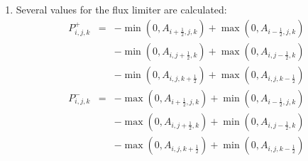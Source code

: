 {\begin{enumerate}
\begin{eqnarray}
&&\max( \left(\rho q\right)^{\dagger}_{i,j-1,k},\left(\rho q\right)^{n}_{i,j-1,k} ),\nonumber\\
&&\max( \left(\rho q\right)^{\dagger}_{i,j+1,k},\left(\rho q\right)^{n}_{i,j+1,k} ),\nonumber\\
&&\max( \left(\rho q\right)^{\dagger}_{i,j,k-1},\left(\rho q\right)^{n}_{i,j,k-1} ),\nonumber\\
&&\max( \left(\rho q\right)^{\dagger}_{i,j,k+1},\left(\rho q\right)^{n}_{i,j,k+1} ) \nonumber\\
&&]\\
\left(\rho q\right)^{\min}_{i,j,k}
&=& \min [\nonumber\\
&&\min( \left(\rho q\right)^{\dagger}_{i,j,k},\left(\rho q\right)^{n}_{i,j,k} ),\nonumber\\
&&\min( \left(\rho q\right)^{\dagger}_{i-1,j,k},\left(\rho q\right)^{n}_{i-1,j,k} ),\nonumber\\
&&\min( \left(\rho q\right)^{\dagger}_{i+1,j,k},\left(\rho q\right)^{n}_{i+1,j,k} ),\nonumber\\
&&\min( \left(\rho q\right)^{\dagger}_{i,j-1,k},\left(\rho q\right)^{n}_{i,j-1,k} ),\nonumber\\
&&\min( \left(\rho q\right)^{\dagger}_{i,j+1,k},\left(\rho q\right)^{n}_{i,j+1,k} ),\nonumber\\
&&\min( \left(\rho q\right)^{\dagger}_{i,j,k-1},\left(\rho q\right)^{n}_{i,j,k-1} ),\nonumber\\
&&\min( \left(\rho q\right)^{\dagger}_{i,j,k+1},\left(\rho q\right)^{n}_{i,j,k+1} ) \nonumber\\
&&]
\end{eqnarray}
\item Several values for the flux limiter are calculated:
\begin{eqnarray}
P_{i,j,k}^{+} &=& 
-\min ( 0, A_{i+\frac{1}{2},j,k} ) + \max( 0, A_{i-\frac{1}{2},j,k} )\nonumber\\
&&
-\min ( 0, A_{i,j+\frac{1}{2},k} ) + \max( 0, A_{i,j-\frac{1}{2},k} )\nonumber\\
&&
-\min ( 0, A_{i,j,k+\frac{1}{2}} ) + \max( 0, A_{i,j,k-\frac{1}{2}} )\\
P_{i,j,k}^{-} &=& 
-\max ( 0, A_{i+\frac{1}{2},j,k} ) + \min( 0, A_{i-\frac{1}{2},j,k} )\nonumber\\
&&
-\max ( 0, A_{i,j+\frac{1}{2},k} ) + \min( 0, A_{i,j-\frac{1}{2},k} )\nonumber\\
&&
-\max ( 0, A_{i,j,k+\frac{1}{2}} ) + \min( 0, A_{i,j,k-\frac{1}{2}} )\\

\end{eqnarray}
\end{enumerate}}
